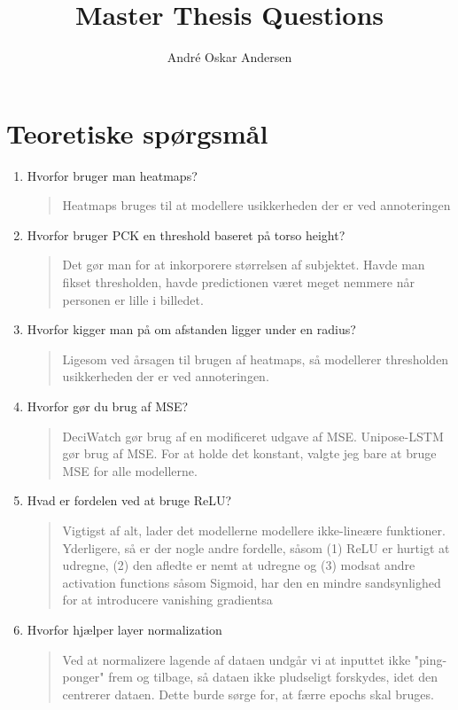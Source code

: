 \documentclass[a4paper]{report}
\title{Master Thesis Questions}
\author{André Oskar Andersen}
\date{}
\begin{document}
    
\maketitle

\section*{Teoretiske spørgsmål}
\begin{enumerate}
    \item Hvorfor bruger man heatmaps?
    \begin{quote}
        Heatmaps bruges til at modellere usikkerheden der er ved annoteringen
    \end{quote}
    \item Hvorfor bruger PCK en threshold baseret på torso height?
    \begin{quote}
        Det gør man for at inkorporere størrelsen af subjektet. Havde man fikset thresholden, havde predictionen været meget nemmere når personen er lille i billedet.
    \end{quote}
    \item Hvorfor kigger man på om afstanden ligger under en radius?
    \begin{quote}
        Ligesom ved årsagen til brugen af heatmaps, så modellerer thresholden usikkerheden der er ved annoteringen.
    \end{quote}
    \item Hvorfor gør du brug af MSE?
    \begin{quote}
        DeciWatch gør brug af en modificeret udgave af MSE. Unipose-LSTM gør brug af MSE. For at holde det konstant, valgte jeg bare at bruge MSE for alle modellerne.
    \end{quote}
    \item Hvad er fordelen ved at bruge ReLU?
    \begin{quote}
        Vigtigst af alt, lader det modellerne modellere ikke-lineære funktioner. Yderligere, så er der nogle andre fordelle, såsom (1) ReLU er hurtigt at udregne, (2) den afledte er nemt at udregne og (3) modsat andre activation functions såsom Sigmoid, har den en mindre sandsynlighed for at introducere vanishing gradientsa
    \end{quote}
    \item Hvorfor hjælper layer normalization
    \begin{quote}
        Ved at normalizere lagende af dataen undgår vi at inputtet ikke "ping-ponger" frem og tilbage, så dataen ikke pludseligt forskydes, idet den centrerer dataen. Dette burde sørge for, at færre epochs skal bruges.

\end{quote}
\end{enumerate}
\end{document}

